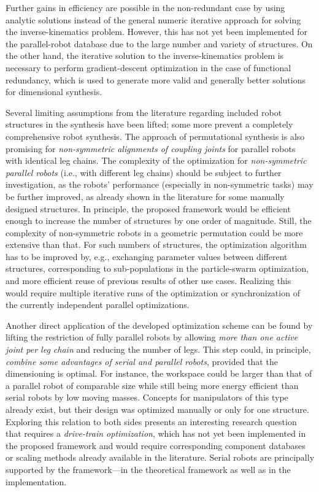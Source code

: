 \documentclass[robotics,article,accept,pdftex,oneauthor]{Definitions/mdpi}
\renewcommand{\hl}[1]{#1}
\begin{document}
{Further gains in efficiency are possible} in the non-redundant case by using analytic solutions instead of the general numeric iterative approach for solving the inverse-kinematics problem.
{However, this has not yet been implemented} for the parallel\hl{-}robot database due to the large {number} and variety of structures. %
On the other hand, the iterative solution to the inverse-kinematics problem is necessary to perform gradient-descent optimization in the case of functional redundancy, which is used to generate more valid and generally better solutions for dimensional synthesis. %

Several limiting assumptions from the literature regarding included robot structures in the synthesis have been lifted; some more prevent a completely comprehensive robot synthesis.
%
%
The approach of permutational synthesis is also promising for \emph{non-symmetric alignments of coupling joints} for parallel robots with identical leg chains. 
The complexity of the optimization for \emph{non-symmetric parallel robots} (i.e., with different leg chains) should be subject to further investigation, as the robots' performance {(especially in non-symmetric tasks)} may be further improved, as already shown in the literature for some manually designed structures. 
In principle, the proposed framework would be efficient enough to increase the number of structures by one order of magnitude.
Still, the complexity of non-symmetric robots in a geometric permutation could be more extensive than that. %
For such numbers of structures, the optimization algorithm has to be improved by, e.g., exchanging parameter values between different structures, corresponding to sub-populations in the particle-swarm optimization, and more efficient reuse of previous results of other use cases. 
Realizing this would require multiple iterative runs of the optimization or synchronization of the currently independent parallel optimizations.

Another direct application of the developed optimization scheme can be found by lifting the restriction of fully parallel robots by allowing \emph{more than one active joint per leg chain} and reducing the number of legs. 
This step could, in principle, \emph{combine some advantages of serial and parallel robots}, provided that the dimensioning is optimal. 
For instance, the workspace could be larger than that of a parallel robot of comparable size while still being more energy efficient than serial robots by low moving masses.
Concepts for manipulators of this type already exist, but their design was optimized manually or only for one structure.
%
Exploring this relation to both sides presents an interesting research question that requires a \emph{drive-train optimization}, which has not yet been implemented in the proposed framework and would require corresponding component databases or scaling methods already available in the literature.
Serial robots are principally supported by the framework---in the theoretical framework as well as in the implementation.
\end{document}
